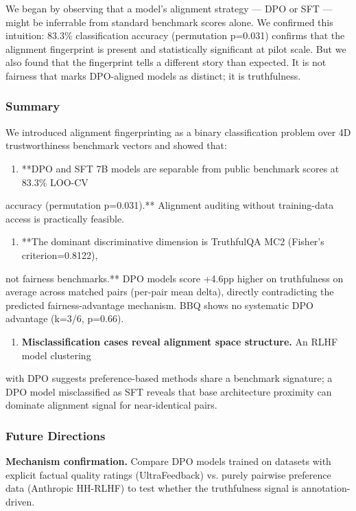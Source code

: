 
We began by observing that a model's alignment strategy --- DPO or SFT --- might be
inferrable from standard benchmark scores alone. We confirmed this intuition: 83.3\%
classification accuracy (permutation p=0.031) confirms that the alignment fingerprint
is present and statistically significant at pilot scale. But we also found that the
fingerprint tells a different story than expected. It is not fairness that marks
DPO-aligned models as distinct; it is truthfulness.

\subsubsection{Summary}

We introduced alignment fingerprinting as a binary classification problem over 4D
trustworthiness benchmark vectors and showed that:

\begin{enumerate}
\item **DPO and SFT 7B models are separable from public benchmark scores at 83.3\% LOO-CV
\end{enumerate}
   accuracy (permutation p=0.031).** Alignment auditing without training-data access is
   practically feasible.

\begin{enumerate}
\item **The dominant discriminative dimension is TruthfulQA MC2 (Fisher's criterion=0.8122),
\end{enumerate}
   not fairness benchmarks.** DPO models score +4.6pp higher on truthfulness on average
   across matched pairs (per-pair mean delta), directly contradicting the predicted
   fairness-advantage mechanism. BBQ shows no systematic DPO advantage (k=3/6, p=0.66).

\begin{enumerate}
\item \textbf{Misclassification cases reveal alignment space structure.} An RLHF model clustering
\end{enumerate}
   with DPO suggests preference-based methods share a benchmark signature; a DPO model
   misclassified as SFT reveals that base architecture proximity can dominate alignment
   signal for near-identical pairs.

\subsubsection{Future Directions}

\textbf{Mechanism confirmation.} Compare DPO models trained on datasets with explicit factual
quality ratings (UltraFeedback) vs. purely pairwise preference data (Anthropic HH-RLHF)
to test whether the truthfulness signal is annotation-driven.

